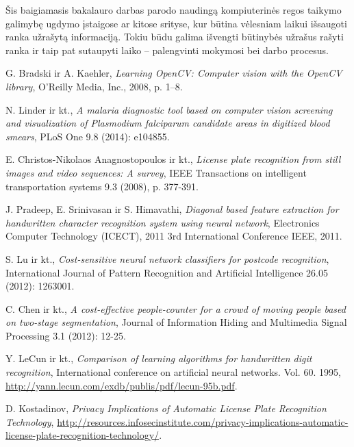 \documentclass[a4paper,12pt]{article}
\begin{document}
Šis baigiamasis bakalauro darbas parodo naudingą kompiuterinės regos taikymo galimybę ugdymo įstaigose ar kitose srityse, kur būtina vėlesniam laikui išsaugoti ranka užrašytą informaciją. Tokiu būdu galima išvengti būtinybės užrašus rašyti ranka ir taip pat sutaupyti laiko – palengvinti mokymosi bei darbo procesus.
 
 
\clearpage 
\begin{thebibliography}{99}
G. Bradski ir A. Kaehler, \textit{Learning OpenCV: Computer vision with the OpenCV library}, O'Reilly Media, Inc., 2008, p. 1–8.

N. Linder ir kt., \textit{A malaria diagnostic tool based on computer vision screening and visualization of Plasmodium falciparum candidate areas in digitized blood smears}, PLoS One 9.8 (2014): e104855.

E. Christos-Nikolaos Anagnostopoulos ir kt., \textit{License plate recognition from still images and video sequences: A survey}, IEEE Transactions on intelligent transportation systems 9.3 (2008), p. 377-391.

J. Pradeep, E. Srinivasan ir S. Himavathi, \textit{Diagonal based feature extraction for handwritten character recognition system using neural network}, Electronics Computer Technology (ICECT), 2011 3rd International Conference IEEE, 2011.

S. Lu ir kt., \textit{Cost-sensitive neural network classifiers for postcode recognition}, International Journal of Pattern Recognition and Artificial Intelligence 26.05 (2012): 1263001.

C. Chen ir kt., \textit{A cost-effective people-counter for a crowd of moving people based on two-stage segmentation}, Journal of Information Hiding and Multimedia Signal Processing 3.1 (2012): 12-25.
 
Y. LeCun ir kt., \textit{Comparison of learning algorithms for handwritten digit recognition}, International conference on artificial neural networks. Vol. 60. 1995, \url{http://yann.lecun.com/exdb/publis/pdf/lecun-95b.pdf}.

D. Kostadinov, \textit{Privacy Implications of Automatic License Plate Recognition Technology}, \url{http://resources.infosecinstitute.com/privacy-implications-automatic-license-plate-recognition-technology/}.


\end{thebibliography}
\end{document}

